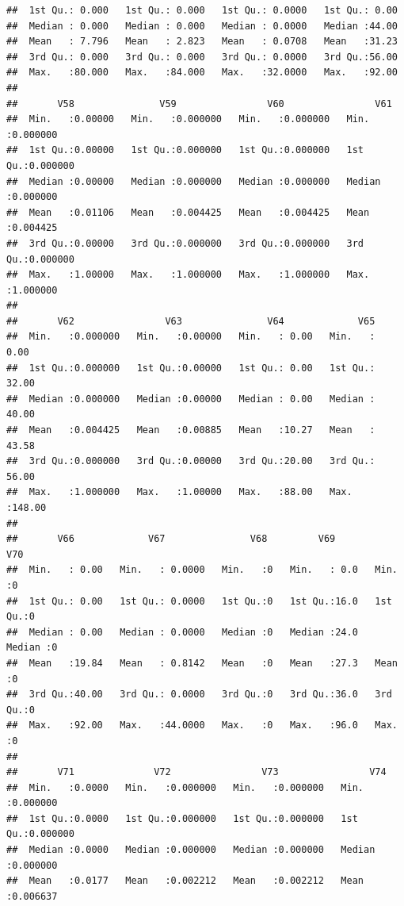 \documentclass[
]{article}
\begin{document}
\begin{verbatim}
##  1st Qu.: 0.000   1st Qu.: 0.000   1st Qu.: 0.0000   1st Qu.: 0.00  
##  Median : 0.000   Median : 0.000   Median : 0.0000   Median :44.00  
##  Mean   : 7.796   Mean   : 2.823   Mean   : 0.0708   Mean   :31.23  
##  3rd Qu.: 0.000   3rd Qu.: 0.000   3rd Qu.: 0.0000   3rd Qu.:56.00  
##  Max.   :80.000   Max.   :84.000   Max.   :32.0000   Max.   :92.00  
##                                                                     
##       V58               V59                V60                V61          
##  Min.   :0.00000   Min.   :0.000000   Min.   :0.000000   Min.   :0.000000  
##  1st Qu.:0.00000   1st Qu.:0.000000   1st Qu.:0.000000   1st Qu.:0.000000  
##  Median :0.00000   Median :0.000000   Median :0.000000   Median :0.000000  
##  Mean   :0.01106   Mean   :0.004425   Mean   :0.004425   Mean   :0.004425  
##  3rd Qu.:0.00000   3rd Qu.:0.000000   3rd Qu.:0.000000   3rd Qu.:0.000000  
##  Max.   :1.00000   Max.   :1.000000   Max.   :1.000000   Max.   :1.000000  
##                                                                            
##       V62                V63               V64             V65        
##  Min.   :0.000000   Min.   :0.00000   Min.   : 0.00   Min.   :  0.00  
##  1st Qu.:0.000000   1st Qu.:0.00000   1st Qu.: 0.00   1st Qu.: 32.00  
##  Median :0.000000   Median :0.00000   Median : 0.00   Median : 40.00  
##  Mean   :0.004425   Mean   :0.00885   Mean   :10.27   Mean   : 43.58  
##  3rd Qu.:0.000000   3rd Qu.:0.00000   3rd Qu.:20.00   3rd Qu.: 56.00  
##  Max.   :1.000000   Max.   :1.00000   Max.   :88.00   Max.   :148.00  
##                                                                       
##       V66             V67               V68         V69            V70   
##  Min.   : 0.00   Min.   : 0.0000   Min.   :0   Min.   : 0.0   Min.   :0  
##  1st Qu.: 0.00   1st Qu.: 0.0000   1st Qu.:0   1st Qu.:16.0   1st Qu.:0  
##  Median : 0.00   Median : 0.0000   Median :0   Median :24.0   Median :0  
##  Mean   :19.84   Mean   : 0.8142   Mean   :0   Mean   :27.3   Mean   :0  
##  3rd Qu.:40.00   3rd Qu.: 0.0000   3rd Qu.:0   3rd Qu.:36.0   3rd Qu.:0  
##  Max.   :92.00   Max.   :44.0000   Max.   :0   Max.   :96.0   Max.   :0  
##                                                                          
##       V71              V72                V73                V74          
##  Min.   :0.0000   Min.   :0.000000   Min.   :0.000000   Min.   :0.000000  
##  1st Qu.:0.0000   1st Qu.:0.000000   1st Qu.:0.000000   1st Qu.:0.000000  
##  Median :0.0000   Median :0.000000   Median :0.000000   Median :0.000000  
##  Mean   :0.0177   Mean   :0.002212   Mean   :0.002212   Mean   :0.006637  

\end{verbatim}
\end{document}
